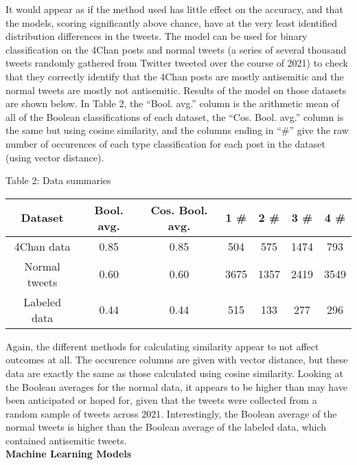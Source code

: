 \documentclass{article}
\begin{document}
It would appear as if the method used has little effect on the accuracy, and that the models, scoring significantly above chance, have at the very least identified distribution differences in the tweets. The model can be used for binary classification on the 4Chan posts and normal tweets (a series of several thousand tweets randomly gathered from Twitter tweeted over the course of 2021) to check that they correctly identify that the 4Chan posts are mostly antisemitic and the normal tweets are mostly not antisemitic. Results of the model on those datasets are shown below. In Table 2, the ``Bool. avg.'' column is the arithmetic mean of all of the Boolean classifications of each dataset, the ``Cos. Bool. avg.'' column is the same but using cosine similarity, and the columns ending in ``\#'' give the raw number of occurences of each type classification for each post in the dataset (using vector distance).
\begin{center}
Table 2: Data summaries\\
\begin{tabular}{ |c|c|c|c|c|c|c|}
\hline {\bf Dataset} & {\bf Bool. avg.} & {\bf Cos. Bool. avg.} & {\bf 1 \#} & {\bf 2 \#} & {\bf 3 \#} & {\bf 4 \#}\\
\hline 4Chan data & 0.85 & 0.85 & 504 & 575 & 1474 & 793\\
\hline Normal tweets & 0.60 & 0.60 & 3675 & 1357 & 2419 & 3549\\
\hline Labeled data & 0.44 & 0.44 & 515 & 133 & 277 & 296\\
\hline
\end{tabular}
\end{center}

Again, the different methods for calculating similarity appear to not affect outcomes at all. The occurence columns are given with vector distance, but these data are exactly the same as those calculated using cosine similarity. Looking at the Boolean averages for the normal data, it appears to be higher than may have been anticipated or hoped for, given that the tweets were collected from a random sample of tweets across 2021. Interestingly, the Boolean average of the normal tweets is higher than the Boolean average of the labeled data, which contained antisemitic tweets.\\

{\bf Machine Learning Models}
\end{document}
